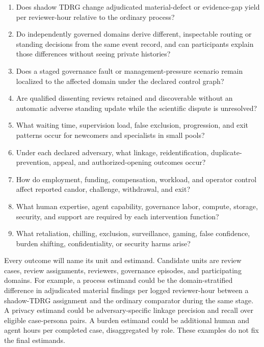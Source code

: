 \documentclass[11pt]{article}
\newcommand{\tdrg}{TDRG}
\begin{document}
\begin{enumerate}
  \item Does shadow \tdrg{} change adjudicated material-defect or evidence-gap
  yield per reviewer-hour relative to the ordinary process?
  \item Do independently governed domains derive different, inspectable routing
  or standing decisions from the same event record, and can participants explain
  those differences without seeing private histories?
  \item Does a staged governance fault or management-pressure scenario remain
  localized to the affected domain under the declared control graph?
  \item Are qualified dissenting reviews retained and discoverable without an
  automatic adverse standing update while the scientific dispute is unresolved?
  \item What waiting time, supervision load, false exclusion, progression, and
  exit patterns occur for newcomers and specialists in small pools?
  \item Under each declared adversary, what linkage, reidentification,
  duplicate-prevention, appeal, and authorized-opening outcomes occur?
  \item How do employment, funding, compensation, workload, and operator control
  affect reported candor, challenge, withdrawal, and exit?
  \item What human expertise, agent capability, governance labor, compute,
  storage, security, and support are required by each intervention function?
  \item What retaliation, chilling, exclusion, surveillance, gaming, false
  confidence, burden shifting, confidentiality, or security harms arise?
\end{enumerate}


Every outcome will name its unit and estimand. Candidate units are review cases,
review assignments, reviewers, governance episodes, and participating domains.
For example, a process estimand could be the domain-stratified difference in
adjudicated material findings per logged reviewer-hour between a shadow-\tdrg{}
assignment and the ordinary comparator during the same stage. A privacy estimand
could be adversary-specific linkage precision and recall over eligible case-persona
pairs. A burden estimand could be additional human and agent hours per completed
case, disaggregated by role. These examples do not fix the final estimands.
\end{document}
